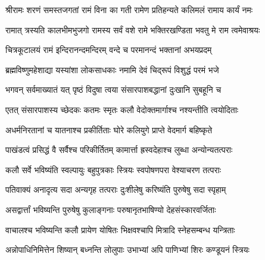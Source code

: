 
\twolineshloka
{श्रीरामः शरणं समस्तजगतां रामं विना का गती}
{रामेण प्रतिहन्यते कलिमलं रामाय कार्यं नमः}

 

\twolineshloka
{रामात् त्रस्यति कालभीमभुजगो रामस्य सर्वं वशे}
{रामे भक्तिरखण्डिता भवतु मे राम त्वमेवाश्रयः}%

 

\twolineshloka
{चित्रकूटालयं रामं इन्दिरानन्दमन्दिरम्}
{वन्दे च परमानन्दं भक्तानां अभयप्रदम्}%

 

\twolineshloka
{ब्रह्मविष्णुमहेशाद्या यस्यांशा लोकसाधकाः}
{नमामि देवं चिद्‌रूपं विशुद्धं परमं भजे}%

 


\twolineshloka
{भगवन् सर्वमाख्यातं यत् पृष्ठं विदुषा त्वया}
{संसारपाशबद्धानां दुःखानि सुबहूनि च}%

 

\twolineshloka
{एतत् संसारपाशस्य च्छेदकः कतमः स्मृतः}
{कलौ वेदोक्तमार्गाश्च नश्यन्तीति त्वयोदिताः}%

 

\twolineshloka
{अधर्मनिरतानां च यातनाश्च प्रकीर्तिताः}
{घोरे कलियुगे प्राप्ते वेदमार्ग बहिष्कृते}%

 

\twolineshloka
{पाखंडत्वं प्रसिद्धं वै सर्वैश्च परिकीर्तितम्}
{कामार्त्ता ह्रस्वदेहाश्च लुब्धा अन्योन्यतत्पराः}%

 

\twolineshloka
{कलौ सर्वे भविष्यंति स्वल्पायुः बहुपुत्रकाः}
{स्त्रियः स्वपोषणपरा वेश्याचरण तत्पराः}%

 

\twolineshloka
{पतिवाक्यं अनादृत्य सदा अन्यगृह तत्पराः}
{दुःशीलेषु करिष्यंति पुरुषेषु सदा स्पृहाम्}%

 

\twolineshloka
{असद्वार्त्तां भविष्यन्ति पुरुषेषु कुलाङ्गनाः}
{परुषानृतभाषिण्यो देहसंस्कारवर्जिताः}%

 

\twolineshloka
{वाचालश्च भविष्यन्ति कलौ प्रायेण योषितः}
{भिक्षवश्चापि मित्रादि स्नेहसम्बन्ध यन्त्रिताः}%

 

\twolineshloka
{अन्नोपाधिनिमित्तेन शिष्यान् बध्नन्ति लोलुपाः}
{उभाभ्यां अपि पाणिभ्यां शिरः कण्डूयनं स्त्रियः}%

 

